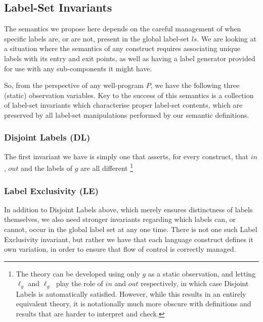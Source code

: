 \subsection{Label-Set Invariants}

The semantics we propose here depends on the careful management
of when specific labels are, or are not,
present in the global label-set $ls$.
We are looking at a situation where the semantics of any construct
requires associating unique labels with its entry and exit points,
as well as having a label generator provided for use with any sub-components
it might have.

So, from the perspective of any well-program $P$,
we have the following three (static) observation variables.
Key to the success of this semantics is a collection of label-set invariants
which characterise proper label-set contents,
which are preserved by all label-set manipulations performed
by our semantic definitions.

\subsubsection{Disjoint Labels (DL)}\label{sssec:disjoint-labels}

The first invariant we have is simply one that asserts,
for every construct, that $in$, $out$ and the labels of $g$
are all different
\footnote{The theory can be developed using only $g$ as a static observation,
and letting $\ell_g$ and $\ell_{g:}$ play the role of $in$ and $out$
respectively, in which case Disjoint Labels is automatically satisfied.
However, while this results in an entirely equivalent theory,
it is notationally much more obscure
with definitions and results that are harder to interpret and check.
}%



\subsubsection{Label Exclusivity (LE)}

In addition to Disjoint Labels above,
which merely ensures distinctness of labels themselves,
we also need stronger invariants regarding which labels can, or cannot,
occur in the global label set at any one time.
There is not one such Label Exclusivity invariant,
but rather we have that each language construct defines it own
variation, in order to ensure that flow of control is correctly managed.

